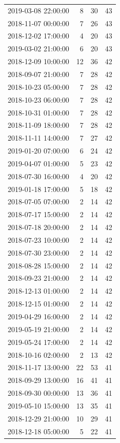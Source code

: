 \begin{tabular}{lrrr}
2019-03-08 22:00:00 & 8 & 30 & 43 \\
2018-11-07 00:00:00 & 7 & 26 & 43 \\
2018-12-02 17:00:00 & 4 & 20 & 43 \\
2019-03-02 21:00:00 & 6 & 20 & 43 \\
2018-12-09 10:00:00 & 12 & 36 & 42 \\
2018-09-07 21:00:00 & 7 & 28 & 42 \\
2018-10-23 05:00:00 & 7 & 28 & 42 \\
2018-10-23 06:00:00 & 7 & 28 & 42 \\
2018-10-31 01:00:00 & 7 & 28 & 42 \\
2018-11-09 18:00:00 & 7 & 28 & 42 \\
2018-11-11 14:00:00 & 7 & 27 & 42 \\
2019-01-20 07:00:00 & 6 & 24 & 42 \\
2019-04-07 01:00:00 & 5 & 23 & 42 \\
2018-07-30 16:00:00 & 4 & 20 & 42 \\
2019-01-18 17:00:00 & 5 & 18 & 42 \\
2018-07-05 07:00:00 & 2 & 14 & 42 \\
2018-07-17 15:00:00 & 2 & 14 & 42 \\
2018-07-18 20:00:00 & 2 & 14 & 42 \\
2018-07-23 10:00:00 & 2 & 14 & 42 \\
2018-07-30 23:00:00 & 2 & 14 & 42 \\
2018-08-28 15:00:00 & 2 & 14 & 42 \\
2018-09-23 21:00:00 & 2 & 14 & 42 \\
2018-12-13 01:00:00 & 2 & 14 & 42 \\
2018-12-15 01:00:00 & 2 & 14 & 42 \\
2019-04-29 16:00:00 & 2 & 14 & 42 \\
2019-05-19 21:00:00 & 2 & 14 & 42 \\
2019-05-24 17:00:00 & 2 & 14 & 42 \\
2018-10-16 02:00:00 & 2 & 13 & 42 \\
2018-11-17 13:00:00 & 22 & 53 & 41 \\
2018-09-29 13:00:00 & 16 & 41 & 41 \\
2018-09-30 00:00:00 & 13 & 36 & 41 \\
2019-05-10 15:00:00 & 13 & 35 & 41 \\
2018-12-29 21:00:00 & 10 & 29 & 41 \\
2018-12-18 05:00:00 & 5 & 22 & 41 \\

\end{tabular}
